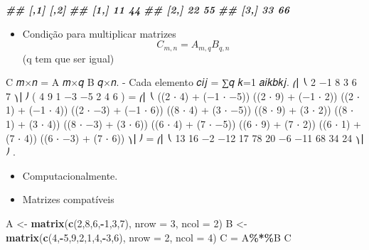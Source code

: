 \documentclass[
]{article}
\newenvironment{Shaded}{\begin{snugshade}}{\end{snugshade}}
\newcommand{\AttributeTok}[1]{\textcolor[rgb]{0.13,0.29,0.53}{#1}}
\newcommand{\DecValTok}[1]{\textcolor[rgb]{0.00,0.00,0.81}{#1}}
\newcommand{\DocumentationTok}[1]{\textcolor[rgb]{0.56,0.35,0.01}{\textbf{\textit{#1}}}}
\newcommand{\FunctionTok}[1]{\textcolor[rgb]{0.13,0.29,0.53}{\textbf{#1}}}
\newcommand{\NormalTok}[1]{#1}
\newcommand{\OtherTok}[1]{\textcolor[rgb]{0.56,0.35,0.01}{#1}}
\newcommand{\SpecialCharTok}[1]{\textcolor[rgb]{0.81,0.36,0.00}{\textbf{#1}}}
\providecommand{\tightlist}{%
  \setlength{\itemsep}{0pt}\setlength{\parskip}{0pt}}
\begin{document}
\begin{Shaded}
\begin{Highlighting}[]
\DocumentationTok{\#\# [,1] [,2]}
\DocumentationTok{\#\# [1,] 11 44}
\DocumentationTok{\#\# [2,] 22 55}
\DocumentationTok{\#\# [3,] 33 66}
\end{Highlighting}
\end{Shaded}

\begin{itemize}
\tightlist
\item
  Condição para multiplicar matrizes \[
  C_{m, n} = A_{m,q} B_{q,n}
  \] (q tem que ser igual)
\end{itemize}

C 𝑚×𝑛 = A 𝑚×𝑞 B 𝑞×𝑛. - Cada elemento 𝑐𝑖𝑗 = ∑𝑞 𝑘=1 𝑎𝑖𝑘𝑏𝑘𝑗. ⎛⎜ ⎝ 2 −1 8 3
6 7 ⎞⎟ ⎠ ( 4 9 1 −3 −5 2 4 6 ) = ⎛⎜ ⎝ ((2 ⋅ 4) + (−1 ⋅ −5)) ((2 ⋅ 9) +
(−1 ⋅ 2)) ((2 ⋅ 1) + (−1 ⋅ 4)) ((2 ⋅ −3) + (−1 ⋅ 6)) ((8 ⋅ 4) + (3 ⋅
−5)) ((8 ⋅ 9) + (3 ⋅ 2)) ((8 ⋅ 1) + (3 ⋅ 4)) ((8 ⋅ −3) + (3 ⋅ 6)) ((6 ⋅
4) + (7 ⋅ −5)) ((6 ⋅ 9) + (7 ⋅ 2)) ((6 ⋅ 1) + (7 ⋅ 4)) ((6 ⋅ −3) + (7 ⋅
6)) ⎞⎟ ⎠ = ⎛⎜ ⎝ 13 16 −2 −12 17 78 20 −6 −11 68 34 24 ⎞⎟ ⎠ .

\begin{itemize}
\tightlist
\item
  Computacionalmente.
\item
  Matrizes compatíveis
\end{itemize}

\begin{Shaded}
\begin{Highlighting}[]
\NormalTok{A }\OtherTok{\textless{}{-}} \FunctionTok{matrix}\NormalTok{(}\FunctionTok{c}\NormalTok{(}\DecValTok{2}\NormalTok{,}\DecValTok{8}\NormalTok{,}\DecValTok{6}\NormalTok{,}\SpecialCharTok{{-}}\DecValTok{1}\NormalTok{,}\DecValTok{3}\NormalTok{,}\DecValTok{7}\NormalTok{),}
\AttributeTok{nrow =} \DecValTok{3}\NormalTok{, }\AttributeTok{ncol =} \DecValTok{2}\NormalTok{)}
\NormalTok{B }\OtherTok{\textless{}{-}} \FunctionTok{matrix}\NormalTok{(}\FunctionTok{c}\NormalTok{(}\DecValTok{4}\NormalTok{,}\SpecialCharTok{{-}}\DecValTok{5}\NormalTok{,}\DecValTok{9}\NormalTok{,}\DecValTok{2}\NormalTok{,}\DecValTok{1}\NormalTok{,}\DecValTok{4}\NormalTok{,}\SpecialCharTok{{-}}\DecValTok{3}\NormalTok{,}\DecValTok{6}\NormalTok{),}
\AttributeTok{nrow =} \DecValTok{2}\NormalTok{, }\AttributeTok{ncol =} \DecValTok{4}\NormalTok{)}
\NormalTok{C }\OtherTok{=}\NormalTok{ A}\SpecialCharTok{\%*\%}\NormalTok{B}
\NormalTok{C}
\end{Highlighting}
\end{Shaded}
\end{document}
